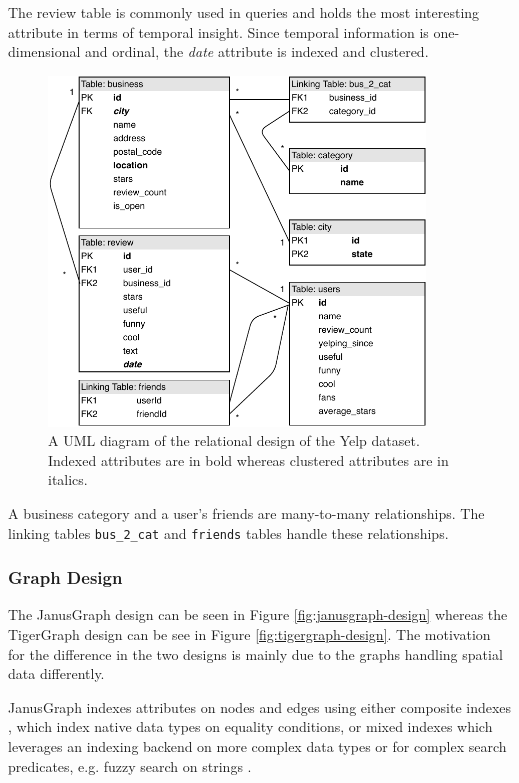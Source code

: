 The review table is commonly used in queries and holds the most interesting attribute in terms of temporal insight. Since temporal information is one-dimensional and ordinal, the \emph{date} attribute is indexed and clustered.

\begin{figure}[h]
    \centering
    \includegraphics[width=10cm]{img/relational-design.pdf}
    \caption{A UML diagram of the relational design of the Yelp dataset. Indexed attributes are in bold whereas clustered attributes are in italics.}
    \label{fig:relational-design}
\end{figure}

A business category and a user's friends are many-to-many relationships. The linking tables \texttt{bus\_2\_cat} and \texttt{friends} tables handle these relationships.

\subsubsection{Graph Design}

The JanusGraph design can be seen in Figure \ref{fig:janusgraph-design} whereas the TigerGraph design can be see in Figure \ref{fig:tigergraph-design}. The motivation for the difference in the two designs is mainly due to the graphs handling spatial data differently.

JanusGraph indexes attributes on nodes and edges using either composite indexes \cite{janusgraph-comp-index}, which index native data types on equality conditions, or mixed indexes which leverages an indexing backend on more complex data types or for complex search predicates, e.g. fuzzy search on strings \cite{janusgraph-mixed-index}.

